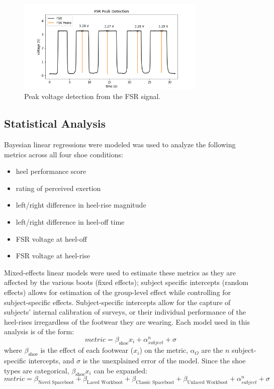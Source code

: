 \documentclass[defaultstyle,11pt]{thesis}
\providecommand{\tightlist}{%
  \setlength{\itemsep}{0pt}\setlength{\parskip}{0pt}}
\begin{document}
\begin{figure}
\hypertarget{fig:SA4-FSRpeaks}{%
\centering
\includegraphics[width=0.8\textwidth,height=\textheight]{../fig/SA4/FSRpeaks.png}
\caption{Peak voltage detection from the FSR signal.}\label{fig:SA4-FSRpeaks}
}
\end{figure}

\hypertarget{statistical-analysis}{%
\subsection{Statistical Analysis}\label{statistical-analysis}}

Bayesian linear regressions were modeled was used to analyze the following metrics across all four shoe conditions:

\begin{itemize}
\tightlist
\item
  heel performance score
\item
  rating of perceived exertion
\item
  left/right difference in heel-rise magnitude
\item
  left/right difference in heel-off time
\item
  FSR voltage at heel-off
\item
  FSR voltage at heel-rise
\end{itemize}

Mixed-effects linear models were used to estimate these metrics as they are affected by the various boots (fixed effects); subject specific intercepts (random effects) allows for estimation of the group-level effect while controlling for subject-specific effects.
Subject-specific intercepts allow for the capture of subjects' internal calibration of surveys, or their individual performance of the heel-rises irregardless of the footwear they are wearing.
Each model used in this analysis is of the form:
\begin{equation}{
metric = \beta_{\text{shoe}}x_{i}+\alpha_{subject}^{n}+\sigma
}\end{equation}
where \(\beta_{\text{shoe}}\) is the effect of each footwear (\(x_{i}\)) on the metric, \(\alpha_{O}\) are the \(n\) subject-specific intercepts, and \(\sigma\) is the unexplained error of the model.
Since the shoe types are categorical, \(\beta_{\text{shoe}}x_{i}\) can be expanded:
\begin{equation}{
metric = \beta_{\text{Novel Spaceboot}}+\beta_{\text{Laced Workboot}}+\beta_{\text{Classic Spaceboot}}+\beta_{\text{Unlaced Workboot}}+\alpha_{subject}^{n}+\sigma
}\end{equation}
\end{document}
